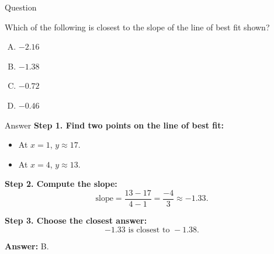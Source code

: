 \documentclass{beamer}
\begin{document}
\begin{frame}{Question}
\scriptsize


\begin{center}

\end{center}

Which of the following is closest to the slope of the line of best fit shown?

\begin{enumerate}[A.]
    \item $-2.16$
    \item $-1.38$
    \item $-0.72$
    \item $-0.46$
\end{enumerate}
\end{frame}


\begin{frame}{Answer}
\textbf{Step 1. Find two points on the line of best fit:}
\begin{itemize}
    \item At $x=1$, $y \approx 17$.
    \item At $x=4$, $y \approx 13$.
\end{itemize}

\textbf{Step 2. Compute the slope:}
\[
\text{slope} = \frac{13-17}{4 - 1} = \frac{-4}{3} \approx -1.33.
\]

\textbf{Step 3. Choose the closest answer:}
\[
-1.33 \text{ is closest to } -1.38.
\]

\textbf{Answer:} B.
\end{frame}
\end{document}

